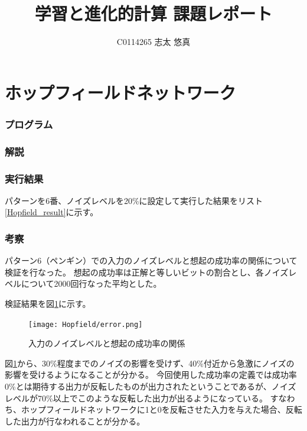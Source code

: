 \documentclass{jsarticle}
\title{学習と進化的計算 課題レポート}
\author{C0114265 志太 悠真}
\begin{document}
\maketitle

\part{ホップフィールドネットワーク}
\section{プログラム}


\section{解説}


\section{実行結果}
パターンを6番、ノイズレベルを20\%に設定して実行した結果をリスト\ref{Hopfield_result}に示す。


\section{考察}
パターン6（ペンギン）での入力のノイズレベルと想起の成功率の関係について検証を行なった。
想起の成功率は正解と等しいビットの割合とし、各ノイズレベルについて2000回行なった平均とした。

検証結果を図\ref{noise_success_rate}に示す。
\begin{figure}[H]
	\begin{center}
		\texttt{[image: Hopfield/error.png]}
		\caption{入力のノイズレベルと想起の成功率の関係\label{noise_success_rate}}
	\end{center}
\end{figure}

図\ref{noise_success_rate}から、30\%程度までのノイズの影響を受けず、40\%付近から急激にノイズの影響を受けるようになることが分かる。
今回使用した成功率の定義では成功率0\%とは期待する出力が反転したものが出力されたということであるが、ノイズレベルが70\%以上でこのような反転した出力が出るようになっている。
すなわち、ホップフィールドネットワークに1と0を反転させた入力を与えた場合、反転した出力が行なわれることが分かる。
\end{document}
